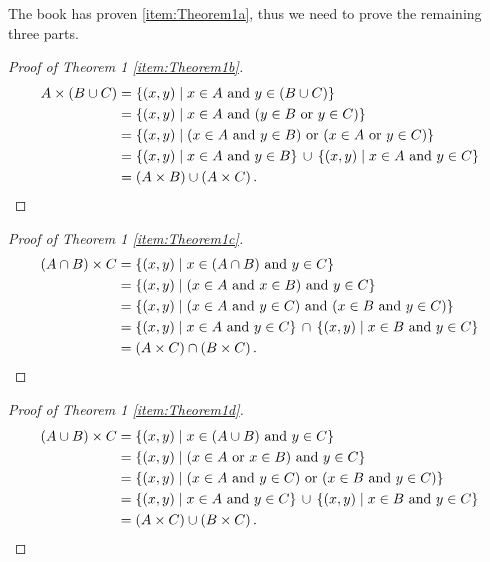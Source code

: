 \documentclass[a4paper, english, 12pt]{article} %
\begin{document}
\begin{answer}
  The book has proven \cref{item:Theorem1a}, thus we need to prove the remaining
  three parts.
  \begin{proof}[Proof of Theorem 1 \ref{item:Theorem1b}]
    \begin{align*}
      A \times (B \cup C)
      & = \{ (x,y) \mid x \in A \ \text{and} \ y \in (B \cup C) \} \\
      & = \{ (x,y) \mid x \in A \ \text{and} \ (y \in B \ \text{or} \ y \in C) \} \\
      & = \{ (x,y) \mid (x \in A \ \text{and} \ y \in B) \ \text{or} \ (x \in A \ \text{or} \ y \in C) \} \\
      & = \{ (x,y) \mid x \in A \ \text{and} \ y \in B \}
          \, \cup \, 
          \{ (x,y) \mid x \in A \ \text{and} \ y \in C \} \\
      & = (A \times B) \cup (A \times C)\,. \qedhere
    \end{align*}
  \end{proof}
  \begin{proof}[Proof of Theorem 1 \ref{item:Theorem1c}]
    \begin{align*}
      (A \cap B ) \times C
      & = \{ (x,y) \mid x \in (A \cap B) \ \text{and} \ y \in C \} \\
      & = \{ (x,y) \mid (x \in A \ \text{and} \ x \in B) \ \text{and} \ y \in C \} \\
      & = \{ (x,y) \mid (x \in A \ \text{and} \ y \in C) \ \text{and} \ (x \in B \ \text{and} \ y \in C) \} \\
      & = \{ (x,y) \mid x \in A \ \text{and} \ y \in C \}
          \, \cap \, 
          \{ (x,y) \mid x \in B \ \text{and} \ y \in C \} \\
      & = (A \times C) \cap (B \times C)\,. \qedhere
    \end{align*}
  \end{proof}
  \begin{proof}[Proof of Theorem 1 \ref{item:Theorem1d}]
    \begin{align*}
      (A \cup B) \times C 
      & = \{ (x,y) \mid x \in (A \cup B) \ \text{and} \ y \in C \} \\
      & = \{ (x,y) \mid (x \in A \ \text{or} \ x \in B) \ \text{and} \ y \in C \} \\
      & = \{ (x,y) \mid (x \in A \ \text{and} \ y \in C) \ \text{or} \ (x \in B \ \text{and} \ y \in C) \} \\
      & = \{ (x,y) \mid x \in A \ \text{and} \ y \in C \}
          \, \cup \, 
          \{ (x,y) \mid x \in B \ \text{and} \ y \in C \} \\
      & = (A \times C) \cup (B \times C)\,. \qedhere
    \end{align*}
  \end{proof}
\end{answer}
\end{document}
